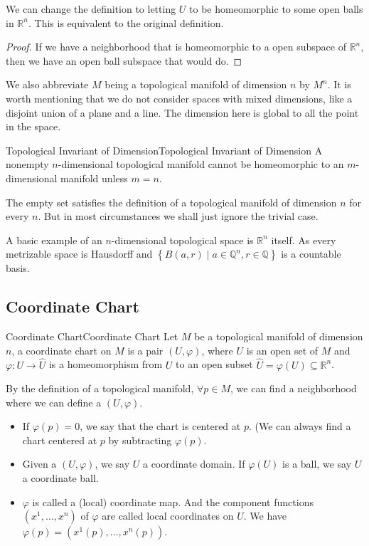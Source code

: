 \documentclass{mathnote}
\begin{document}
\begin{remark}
We can change the definition to letting $U$ to be homeomorphic to some open balls in $\mathbb{R}^n$. This is equivalent to the original definition.

\begin{proof}
If we have a neighborhood that is homeomorphic to a open subspace of $\mathbb{R}^n$, then we have an open ball subspace that would do.
\end{proof}

We also abbreviate $M$ being a topological manifold of dimension  $n$ by $M^n$. It is worth mentioning that we do not consider spaces with mixed dimensions, like a disjoint union of a plane and a line. The dimension here is global to all the point in the space.
\end{remark}

\begin{theorem}{Topological Invariant of Dimension}{Topological Invariant of Dimension}
A nonempty $n$-dimensional topological manifold cannot be homeomorphic to an  $m$-dimensional manifold unless $m=n$.
\end{theorem}
\begin{remark}
The empty set satisfies the definition of a topological manifold of dimension $n$ for every $n$. But in most circumstances we shall just ignore the trivial case.
\end{remark}

A basic example of an $n$-dimensional topological space is $\mathbb{R}^n$ itself. As every metrizable space is Hausdorff and $\left\{ B(a,r)\mid a\in \mathbb{Q}^n, r\in \mathbb{Q} \right\}$ is a countable basis.

\subsection{Coordinate Chart}

\begin{definition}{Coordinate Chart}{Coordinate Chart}
Let $M$ be a topological manifold of dimension $n$, a coordinate chart on $M$ is a pair $(U, \varphi)$, where $U$ is an open set of $M$ and $\varphi: U \rightarrow \hat{U}$ is a homeomorphism from  $U$ to an open subset $\hat{U} = \varphi(U) \subseteq \mathbb{R}^n$.
\end{definition}
By the definition of a topological manifold, $\forall p\in M$, we can find a neighborhood where we can define a $(U,\varphi)$.
\begin{itemize}
\item If $\varphi(p) = 0$, we say that the chart is centered at $p$. (We can always find a chart centered at $p$ by subtracting $\varphi(p)$.
\item Given a $(U,\varphi)$, we say $U$ a coordinate domain. If $\varphi(U)$ is a ball, we say $U$ a coordinate ball.
\item $\varphi$ is called a (local) coordinate map. And the component functions $(x^1, \ldots , x^n)$ of $\varphi$ are called local coordinates on $U$. We have $\varphi(p) = \left(x^1(p), \ldots ,x^n(p)\right)$.
\end{itemize}
\end{document}
